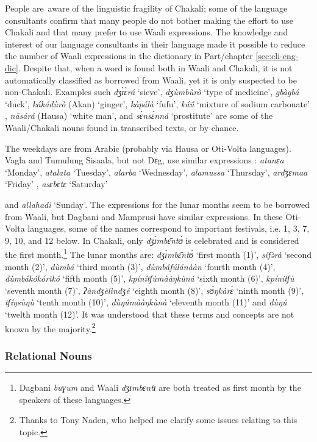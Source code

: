 \begin{exe}
\begin{exe}
\begin{exe}
{\begin{exe}
\begin{exe}
\begin{exe}
\begin{exe}
\begin{exe}
\begin{exe}
\begin{exe}
People are aware of the linguistic fragility of Chakali; some of the
language
consultants confirm that many people do not bother making  the effort to use
Chakali and that many
prefer to use Waali expressions.  The knowledge and interest of our
language consultants in their language made  it possible  to reduce the number
of
Waali
expressions in the dictionary in Part/chapter \ref{sec:cli-eng-dic}.  Despite 
that,
when a word is found both in
Waali and Chakali, it is not automatically classified as borrowed from Waali,
yet it is only suspected to be non-Chakali.  Examples such
{\it dʒɪ̀ɛ̀rá} `sieve', {\it dʒùmbùrò} `type of medicine', {\it gbàgbá}
`duck', {\it kákádùrò} (Akan)  `ginger', {\it kàpálà} `fufu', {\it 
káṹ}  `mixture
of sodium carbonate' , {\it nāsárá}  (Hausa) `white man', and  {\it 
sɛ̀nsɛ́nná}
`prostitute' are some of the Waali/Chakali nouns  found in transcribed texts, or
by chance. 

The weekdays are from Arabic (probably via Hausa or Oti-Volta languages).
Vagla and
Tumulung Sisaala,  but  not Dɛg, use similar expressions \citep[60]{Nade96}: 
{\it atanɛa} `Monday', {\it atalata} `Tuesday', {\it alarba} `Wednesday',   
{\it alamussa} `Thursday',  {\it ardʒɛmaa} `Friday' , {\it asɛbɛtɛ} `Saturday'  
 
 and
{\it allahadi} `Sunday'.  The expressions for the lunar months seem to be
borrowed from Waali, but Dagbani and Mamprusi have similar expressions. In
these
Oti-Volta languages, some of the names  correspond to important festivals, i.e.
1, 3, 7, 9, 10, and 12 below. In Chakali, only {\it dʒɪ́mbɛ̄ntʊ̀} is celebrated
and  is considered the first month.\footnote{Dagbani {\it buɣum} and Waali 
{\it  dʒɪmbɛntɪ} are both treated as first month by the speakers of these
languages.} The lunar months are: {\it dʒɪ́mbɛ̄ntʊ̀} `first month
(1)', {\it sífə̀rà}  `second month (2)', {\it dùmbá} `third month (3)', 
{\it dùmbáfúlánààn} `fourth month (4)',  {\it dùmbákókórìkó} `fifth 
month
(5)', {\it kpínítʃùmààŋkùná} `sixth month (6)', {\it kpínítʃù} 
`seventh
month (7)', {\it ʔàndʒèlìndʒé} `eighth month (8)', {\it sʊ́ŋkàrɛ̀} `ninth
month (9)', {\it tʃíŋsùŋù} `tenth month (10)', {\it dùŋúmààŋkùnà}
`eleventh month (11)' and {\it dùŋú} `twelth month (12)'.  It was understood
that
these terms and concepts are not known by the majority.\footnote{Thanks to Tony
Naden, who helped me clarify some issues relating to this topic.} 




\subsubsection{Relational Nouns}
\label{sec:SPA-relnoun}


\end{exe}
\end{exe}
\end{exe}
\end{exe}
\end{exe}
\end{exe}
\end{exe}}
\end{exe}
\end{exe}
\end{exe}
